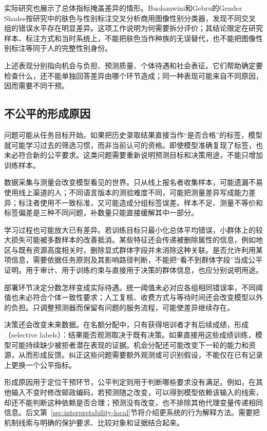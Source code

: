 实际研究也展示了总体指标掩盖差异的情形。Buolamwini和Gebru的Gender Shades按研究中的肤色与性别标注交叉分析商用图像性别分类器，发现不同交叉组的错误水平存在明显差异。这项工作说明为何需要拆分评价；其结论限定在研究样本、标注方式和当时系统上，不能把肤色当作种族的无误替代，也不能把图像性别标注等同于人的完整性别身份。

上述表现分别指向机会与负担、预测质量、个体待遇和社会表征。它们帮助确定要检查什么，还不能单独回答差异由哪个环节造成；同一种表现可能来自不同原因，因而需要不同干预。

\subsection{不公平的形成原因}
\label{sec:fairness-causes}

问题可能从任务目标开始。如果把历史录取结果直接当作“是否合格”的标签，模型就可能学习过去的筛选习惯，而非当前认可的资格。即使模型准确复现了标签，也未必符合新的公平要求。这类问题需要重新说明预测目标和决策用途，不能只增加训练样本。

数据采集与测量会改变模型看见的世界。只从线上报名者收集样本，可能遗漏不易使用线上渠道的人；不同语言版本的测验难度不同，可能把测量差异写成能力差异；标注者使用不一致标准，又可能造成分组标签误差。样本不足、测量不等价和标签偏差是三种不同问题，补数量只能直接缓解其中一部分。

学习过程也可能放大已有差异。若训练目标只最小化总体平均错误，小群体上的较大损失可能被多数样本的改善抵消。某些特征还会传递被删除属性的信息，例如地区与既有资源高度相关时，删除显式群体字段并未消除这种关联。是否允许利用某项信息，需要依据任务原则及其影响路径判断，不能把“看不到群体字段”当成公平证明。用于审计、用于训练约束与直接用于决策的群体信息，也应分别说明用途。

部署环节决定分数怎样变成实际待遇。统一阈值未必对应各组相同错误率，不同阈值也未必符合个体一致性要求；人工复核、收费方式与等待时间还会改变模型以外的负担。只调整预测器而保留有问题的服务流程，可能使差异继续存在。

决策还会改变未来数据。在名额分配中，只有获得培训者才有后续成绩，形成（selective labels）：结果能否观测取决于既有决策。如果直接用这些成绩训练，模型可能持续缺少被拒者潜在表现的证据。机会分配还可能改变下一轮的能力和资源，从而形成反馈。纠正这些问题需要额外观测或可识别假设，不能仅在已有记录上更换一个公平指标。

形成原因用于定位干预环节，公平判定则用于判断哪些要求没有满足。例如，在其他输入不变时修改邮政编码，若预测随之改变，可以得到模型依赖该输入的线索，却还不能判断这种依赖是否合理；预测没有改变，也不排除其他代理变量传递相同信息。后文第~\ref{sec:interpretability-local}节将介绍更系统的行为解释方法。需要把机制线索与明确的保护要求、比较对象和证据结合起来。

